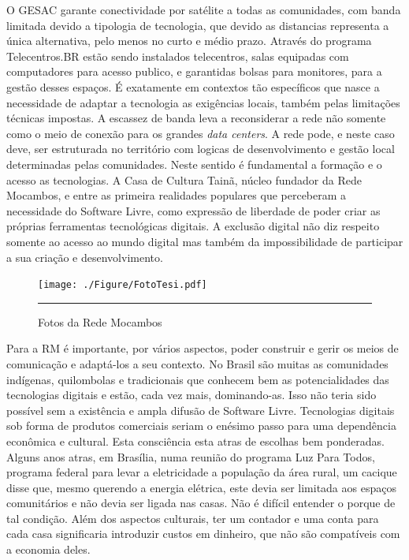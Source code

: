 O GESAC garante conectividade por satélite a todas as comunidades, com
banda limitada devido a tipologia de tecnologia, que devido as
distancias representa a única alternativa, pelo menos no curto e médio
prazo. Através do programa Telecentros.BR estão sendo instalados
telecentros, salas equipadas com computadores para acesso publico, e
garantidas bolsas para monitores, para a gestão desses espaços. É
exatamente em contextos tão específicos que nasce a necessidade de
adaptar a tecnologia as exigências locais, também pelas limitações
técnicas impostas. A escassez de banda leva a reconsiderar a rede não
somente como o meio de conexão para os grandes \emph{data centers}. A
rede pode, e neste caso deve, ser estruturada no território com
logicas de desenvolvimento e gestão local determinadas pelas
comunidades. Neste sentido é fundamental a formação e o acesso as
tecnologias. A Casa de Cultura Tainã, núcleo fundador da Rede
Mocambos, e entre as primeira realidades populares que perceberam a
necessidade do Software Livre, como expressão de liberdade de poder
criar as próprias ferramentas tecnológicas digitais. A exclusão
digital não diz respeito somente ao acesso ao mundo digital mas também
da impossibilidade de participar a sua criação e desenvolvimento.




\begin{figure}[htbp]
  \centering
  \texttt{[image: ./Figure/FotoTesi.pdf]}
  \rule{35em}{0.5pt}
  \caption[Fotos da Rede Mocambos]{Fotos da Rede Mocambos}
  \label{fig:FotoRM}
\end{figure}

Para a RM é importante, por vários aspectos, poder construir e gerir
os meios de comunicação e adaptá-los a seu contexto. No Brasil são
muitas as comunidades indígenas, quilombolas e tradicionais que
conhecem bem as potencialidades das tecnologias digitais e estão, cada
vez mais, dominando-as. Isso não teria sido possível sem a existência
e ampla difusão de Software Livre. Tecnologias digitais sob forma de
produtos comerciais seriam o enésimo passo para uma dependência
econômica e cultural. Esta consciência esta atras de escolhas bem
ponderadas. Alguns anos atras, em Brasília, numa reunião
do programa Luz Para Todos, programa federal para levar a eletricidade
a população da área rural, um cacique disse que, mesmo querendo a
energia elétrica, este devia ser limitada aos espaços comunitários e
não devia ser ligada nas casas. Não é difícil entender o porque de tal
condição. Além dos aspectos culturais, ter um contador e uma conta
para cada casa significaria introduzir custos em dinheiro, que não são
compatíveis com a economia deles. 

